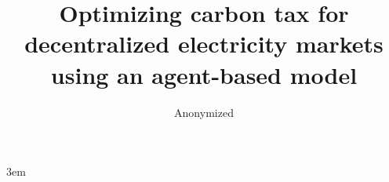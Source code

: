 \documentclass[sigconf]{acmart}
\begin{document}
\emergencystretch 3em

\title[Optimizing carbon tax with optimization]{Optimizing carbon tax for decentralized electricity markets using an agent-based model}

%
%
\author{Anonymized}
\renewcommand{\shortauthors}{Anonymized}
\end{document}
